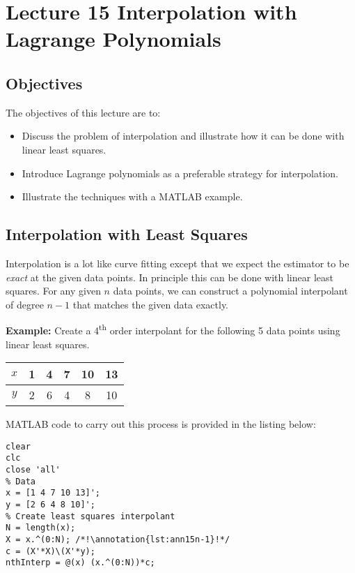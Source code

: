 \chapter{Lecture 15 Interpolation with Lagrange Polynomials}
\label{ch:lec15n}
\section{Objectives}
The objectives of this lecture are to:
\begin{itemize}
\item Discuss the problem of interpolation and illustrate how it can be done with linear least squares.
\item Introduce Lagrange polynomials as a preferable strategy for interpolation.
\item Illustrate the techniques with a MATLAB example.
\end{itemize}
\setcounter{lstannotation}{0}

\section{Interpolation with Least Squares}

Interpolation is a lot like curve fitting except that we expect the estimator to be \emph{exact} at the given data points.  In principle this can be done with linear least squares.  For any given $n$ data points, we can construct a polynomial interpolant of degree $n-1$ that matches the given data exactly.

\vspace{0.15cm}

\noindent \textbf{Example: } Create a 4\textsuperscript{th} order interpolant for the following 5 data points using linear least squares.

\begin{table}
\begin{tabular}{|c|c|c|c|c|c|}
\hline
$x$ & 1 & 4 & 7 & 10 & 13 \\ \hline
$y$ & 2 & 6 & 4 & 8 & 10 \\ \hline
\end{tabular}
\end{table}

\vspace{0.2cm} 

\noindent MATLAB code to carry out this process is provided in the listing below:
\begin{lstlisting}[style=myMatlab]
clear
clc
close 'all'
% Data
x = [1 4 7 10 13]';
y = [2 6 4 8 10]';
% Create least squares interpolant
N = length(x);
X = x.^(0:N); /*!\annotation{lst:ann15n-1}!*/
c = (X'*X)\(X'*y);
nthInterp = @(x) (x.^(0:N))*c;
\end{lstlisting}

